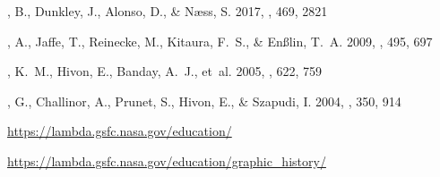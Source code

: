 \documentclass[twocolumn,tighten]{aastex631}
\begin{document}
\begin{thebibliography}
, B., {Dunkley}, J., {Alonso}, D., \& {N{\ae}ss}, S. 2017, \mnras, 469,
  2821

, A., {Jaffe}, T., {Reinecke}, M., {Kitaura}, F.~S., \& {En{\ss}lin},
  T.~A. 2009, \aap, 495, 697

, K.~M., {Hivon}, E., {Banday}, A.~J., {et~al.} 2005, \apj, 622,
  759

, G., {Challinor}, A., {Prunet}, S., {Hivon}, E., \& {Szapudi}, I. 2004,
  \mnras, 350, 914
  
\quad \url{https://lambda.gsfc.nasa.gov/education/}

\quad \url{https://lambda.gsfc.nasa.gov/education/graphic_history/}

\end{thebibliography}
\end{document}
